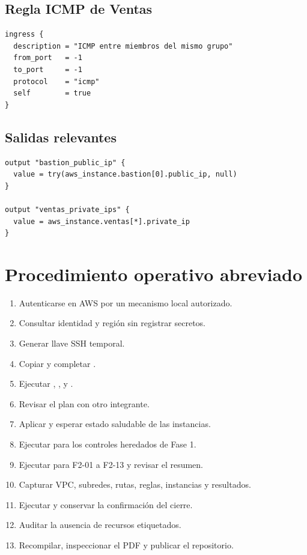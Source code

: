 \section{Regla ICMP de Ventas}

\begin{Verbatim}[fontsize=\footnotesize,frame=single]
ingress {
  description = "ICMP entre miembros del mismo grupo"
  from_port   = -1
  to_port     = -1
  protocol    = "icmp"
  self        = true
}
\end{Verbatim}

\section{Salidas relevantes}

\begin{Verbatim}[fontsize=\footnotesize,frame=single]
output "bastion_public_ip" {
  value = try(aws_instance.bastion[0].public_ip, null)
}

output "ventas_private_ips" {
  value = aws_instance.ventas[*].private_ip
}
\end{Verbatim}

\chapter{Procedimiento operativo abreviado}

\begin{enumerate}
  \item Autenticarse en AWS por un mecanismo local autorizado.
  \item Consultar identidad y región sin registrar secretos.
  \item Generar llave SSH temporal.
  \item Copiar y completar .
  \item Ejecutar , ,  y .
  \item Revisar el plan con otro integrante.
  \item Aplicar y esperar estado saludable de las instancias.
  \item Ejecutar  para los controles heredados de Fase 1.
  \item Ejecutar  para F2-01 a F2-13 y revisar el resumen.
  \item Capturar VPC, subredes, rutas, reglas, instancias y resultados.
  \item Ejecutar  y conservar la confirmación del cierre.
  \item Auditar la ausencia de recursos etiquetados.
  \item Recompilar, inspeccionar el PDF y publicar el repositorio.
\end{enumerate}
